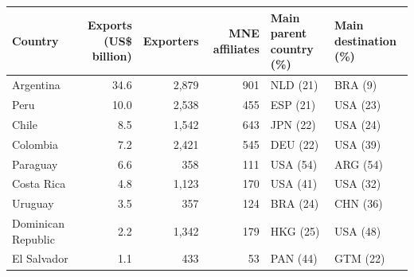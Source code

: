 \begin{tabular}{lrrrll}
\toprule
Country & Exports (US\$ billion) & Exporters & MNE affiliates & Main parent country (\%) & Main destination (\%) \\
\midrule
Argentina & 34.6 & 2,879 & 901 & NLD (21) & BRA (9) \\
Peru & 10.0 & 2,538 & 455 & ESP (21) & USA (23) \\
Chile & 8.5 & 1,542 & 643 & JPN (22) & USA (24) \\
Colombia & 7.2 & 2,421 & 545 & DEU (22) & USA (39) \\
Paraguay & 6.6 & 358 & 111 & USA (54) & ARG (54) \\
Costa Rica & 4.8 & 1,123 & 170 & USA (41) & USA (32) \\
Uruguay & 3.5 & 357 & 124 & BRA (24) & CHN (36) \\
Dominican Republic & 2.2 & 1,342 & 179 & HKG (25) & USA (48) \\
El Salvador & 1.1 & 433 & 53 & PAN (44) & GTM (22) \\
\bottomrule
\end{tabular}

